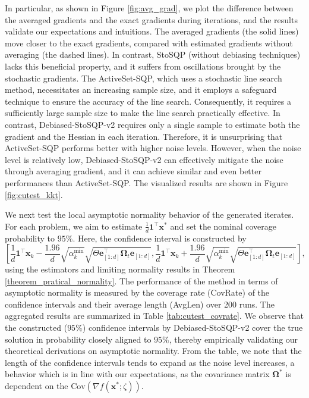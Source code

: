 \documentclass[aos]{imsart}
\numberwithin{equation}{section}
\theoremstyle{plain}
\begin{document}
In particular, as shown in Figure \ref{fig:avg_grad}, we plot the difference between the averaged gradients and the exact gradients during iterations, and the results validate our expectations and intuitions. The averaged gradients (the solid lines) move closer to the exact gradients, compared with estimated gradients without averaging (the dashed lines).
In contrast, StoSQP (without debiasing techniques) lacks this beneficial property, and it suffers from oscillations brought by the stochastic gradients. 
The ActiveSet-SQP, which uses a stochastic line search method, necessitates an increasing sample size, and it employs a safeguard technique to ensure the accuracy of the line search. 
Consequently, it requires a sufficiently large sample size to make the line search practically effective. 
In contrast, Debiased-StoSQP-v2 requires only a single sample to estimate both the gradient and the Hessian in each iteration.
Therefore, it is unsurprising that ActiveSet-SQP performs better with higher noise levels. 
However, when the noise level is relatively low, Debiased-StoSQP-v2 can effectively mitigate the noise through averaging gradient, and it can achieve similar and even better performances than ActiveSet-SQP. 
The visualized results are shown in Figure \ref{fig:cutest_kkt}.


We next test the local asymptotic normality behavior of the generated iterates. For each problem, we aim to estimate $\frac{1}{d}\bm{1}^{\top} \bm{x}^{*}$ and set the nominal coverage probability to $95\%$. Here, the confidence interval is constructed by $$\left[\frac{1}{d}\bm{1}^{\top} \bm{x}_{k} - \frac{1.96}{d}\sqrt{\alpha_k^{\min}}  \sqrt{\Theta \bm{e}_{[1:d]} ^{\top} \bm{\Omega}_{t} \bm{e}_{[1:d]} }, \frac{1}{d}\bm{1}^{\top} \bm{x}_{k} + \frac{1.96}{d}\sqrt{ \alpha_k^{\min}}  \sqrt{\Theta \bm{e}_{[1:d]}^{\top} \bm{\Omega}_{t} \bm{e}_{[1:d]} } \right],$$
using the estimators and limiting normality results in Theorem \ref{theorem_pratical_normality}. The performance of the method in terms of asymptotic normality is measured by the coverage rate (CovRate) of the confidence intervals and their average length (AvgLen) over 200 runs. 
The aggregated results are summarized in Table \ref{tab:cutest_covrate}. We observe that the constructed ($95\%$) confidence intervals by Debiased-StoSQP-v2 cover the true solution in probability closely aligned to $95\%$, thereby empirically validating our theoretical derivations on asymptotic normality. 
From the table, we note that the length of the confidence intervals tends to expand as the noise level increases, a behavior which is in line with our expectations, as the covariance matrix $\bm{\Omega}^{*}$ is dependent on the $\text{Cov}\left( \nabla f(\bm{x}^{*};\zeta)\right)$. 
\end{document}
